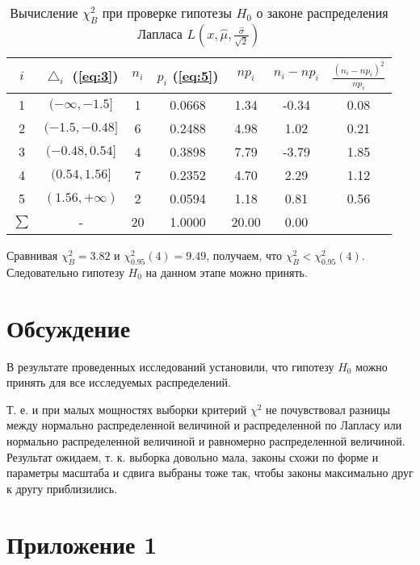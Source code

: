 \documentclass[a4paper, 12pt]{article}
\begin{document}
\begin{table} [H]
\begin{center}
\begin{tabular}{|c|c|c|c|c|c|c|}
\hline 
$i$ & $\bigtriangleup_i$ (\ref{eq:3}) & $n_i$ & $p_i$ (\ref{eq:5}) & $np_i$ & $n_i - np_i$ & $\frac{(n_i-np_i)^2}{np_i}$ \\ 
\hline 
1 & $(-\infty, -1.5]$ & 1 & 0.0668 & 1.34 & -0.34 & 0.08 \\ 
\hline 
2 & $(-1.5, -0.48]$ & 6 & 0.2488 & 4.98 & 1.02 & 0.21 \\ 
\hline 
3 & $(-0.48, 0.54]$ & 4 & 0.3898 & 7.79 & -3.79 & 1.85 \\ 
\hline 
4 & $(0.54, 1.56]$ & 7 & 0.2352 & 4.70 & 2.29 & 1.12 \\ 
\hline 
5 & $(1.56, +\infty)$ & 2 & 0.0594 & 1.18 & 0.81 & 0.56 \\ 
\hline 
$\sum$ & - & 20 & 1.0000 & 20.00 & 0.00 & \color{red}{$3.82= \chi^2_B$} \\ 
\hline 
\end{tabular}
\caption{Вычисление $\chi^2_B$ при проверке гипотезы $H_0$ о законе распределения Лапласа $L \left(x,\widehat{\mu}, \frac{\widehat{\sigma}}{\sqrt{2}} \right)$} 
\end{center}
\end{table}
Сравнивая $\chi^2_B = 3.82$ и $\chi^2_0.95(4) = 9.49$, получаем, что $\chi^2_B < \chi^2_0.95(4)$. Следовательно гипотезу $H_0$ на данном этапе можно принять.

\newpage
\section{Обсуждение}

В результате проведенных исследований установили, что гипотезу $H_0$ можно принять для все исследуемых распределений.

Т. е. и при малых мощностях выборки критерий $\chi^2$ не почувствовал разницы между нормально распределенной величиной и распределенной по Лапласу или нормально распределенной величиной и равномерно распределенной величиной. Результат ожидаем, т. к. выборка довольно мала, законы схожи по форме и параметры масштаба и сдвига выбраны тоже так, чтобы законы максимально друг к другу приблизились.

\newpage
\section{Приложение 1}
\begin{figure}[h]
\end{figure}
\end{document}
